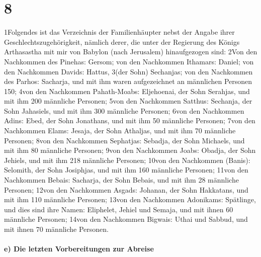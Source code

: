 \hypertarget{section-7}{%
\section{8}\label{section-7}}

1Folgendes ist das Verzeichnis der Familienhäupter nebst der Angabe
ihrer Geschlechtszugehörigkeit, nämlich derer, die unter der Regierung
des Königs Arthasastha mit mir von Babylon (nach Jerusalem)
hinaufgezogen sind: 2Von den Nachkommen des Pinehas: Gersom; von den
Nachkommen Ithamars: Daniel; von den Nachkommen Davids: Hattus, 3(der
Sohn) Sechanjas; von den Nachkommen des Parhos: Sacharja, und mit ihm
waren aufgezeichnet an männlichen Personen 150; 4von den Nachkommen
Pahath-Moabs: Eljehoenai, der Sohn Serahjas, und mit ihm 200 männliche
Personen; 5von den Nachkommen Satthus: Sechanja, der Sohn Jahasiels, und
mit ihm 300 männliche Personen; 6von den Nachkommen Adins: Ebed, der
Sohn Jonathans, und mit ihm 50 männliche Personen; 7von den Nachkommen
Elams: Jesaja, der Sohn Athaljas, und mit ihm 70 männliche Personen;
8von den Nachkommen Sephatjas: Sebadja, der Sohn Michaels, und mit ihm
80 männliche Personen; 9von den Nachkommen Joabs: Obadja, der Sohn
Jehiels, und mit ihm 218 männliche Personen; 10von den Nachkommen
(Banis): Selomith, der Sohn Josiphjas, und mit ihm 160 männliche
Personen; 11von den Nachkommen Bebais: Sacharja, der Sohn Bebais, und
mit ihm 28 männliche Personen; 12von den Nachkommen Asgads: Johanan, der
Sohn Hakkatans, und mit ihm 110 männliche Personen; 13von den Nachkommen
Adonikams: Spätlinge, und dies sind ihre Namen: Eliphelet, Jehiel und
Semaja, und mit ihnen 60 männliche Personen; 14von den Nachkommen
Bigwais: Uthai und Sabbud, und mit ihnen 70 männliche Personen.

\hypertarget{e-die-letzten-vorbereitungen-zur-abreise}{%
\paragraph{e) Die letzten Vorbereitungen zur
Abreise}\label{e-die-letzten-vorbereitungen-zur-abreise}}

